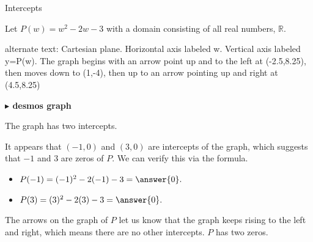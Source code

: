 \documentclass{ximera}
\begin{document}
\begin{example} Intercepts

Let $P(w) = w^2 - 2w - 3$ with a domain consisting of all real numbers, $\mathbb{R}$.






\begin{image}
\end{image}





\textcolor{gray!90}{alternate text: Cartesian plane. Horizontal axis labeled w. Vertical axis labeled y=P(w).  The graph begins with an arrow point up and to the left at (-2.5,8.25), then moves down to (1,-4), then up to an arrow pointing up and right at (4.5,8.25)}

\begin{onlineOnly}
\textbf{\textcolor{blue!55!black}{$\blacktriangleright$ desmos graph}} 
\begin{center}
\end{center}
\end{onlineOnly}






The graph has two intercepts.

It appears that $(-1,0)$ and $(3,0)$ are intercepts of the graph, which suggests that $-1$ and $3$ are zeros of $P$.  We can verify this via the formula.


\begin{itemize}
\item $P(-1) = (-1)^2 -2(-1) - 3 = \answer{0}.$
\item $P(3) = (3)^2 -2(3) - 3 = \answer{0}.$
\end{itemize}


The arrows on the graph of $P$ let us know that the graph keeps rising to the left and right, which means there are no other intercepts. $P$ has two zeros.


\end{example}
\end{document}

